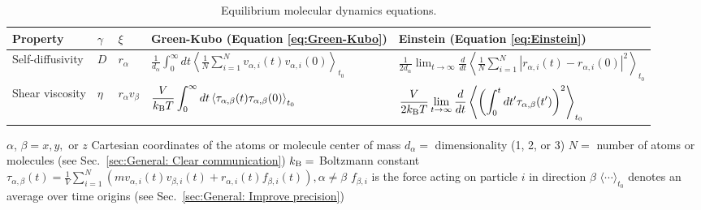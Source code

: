 \documentclass[9pt,bestpractices]{livecoms}
\begin{document}
\begin{table}[tb]
	\caption{\label{tab:EMD_equations}Equilibrium molecular dynamics equations.}

	\begin{tabular}{l l l l l}
		\toprule
		Property & $\gamma$          & $\xi$                        & Green-Kubo (Equation \ref{eq:Green-Kubo})    & Einstein (Equation \ref{eq:Einstein})     \\
		\midrule
		Self-diffusivity     & $D$ & $r_{\alpha}$          & $ \displaystyle \frac{1}{d_\alpha} \int_{0}^{\infty}dt\left\langle \frac{1}{N} \sum_{i=1}^{N} v_{\alpha,i}(t) v_{\alpha,i}(0)\right\rangle_{t_0}$    & $ \displaystyle \frac{1}{2d_\alpha} \lim_{t\to\infty} \frac{d}{dt} \left\langle \frac{1}{N} \sum_{i=1}^{N} |r_{\alpha,i}(t)-r_{\alpha,i}(0)|^2 \right\rangle_{t_0}$   \\
		Shear viscosity     & $\eta$       & $r_\alpha v_\beta$           & $ \displaystyle \frac{V}{k_{\rm B}T} \int_{0}^{\infty}dt\left\langle \tau_{\alpha,\beta}(t) \tau_{\alpha,\beta}(0)\right\rangle_{t_0}$    & $ \displaystyle \frac{V}{2k_{\rm B}T} \lim_{t\to\infty} \frac{d}{dt} \left\langle \left(\int_{0}^{t}dt' \tau_{\alpha,\beta}(t')\right)^2 \right\rangle_{t_0}$  \\
		\bottomrule
	\end{tabular}
	\newline
	$\alpha$, $\beta = x, y, $ or $z$ Cartesian coordinates of the atoms or molecule center of mass \newline
	$d_\alpha =$ dimensionality (1, 2, or 3) \newline
	$N=$ number of atoms or molecules (see Sec.\ \ref{sec:General: Clear communication}) \newline
	$k_{\rm B}=$ Boltzmann constant \newline
	$\tau_{\alpha,\beta}(t) = \frac{1}{V} \sum_{i=1}^{N} \left( m v_{\alpha,i}(t) v_{\beta,i}(t) + r_{\alpha,i}(t) f_{\beta,i}(t) \right) , \alpha \ne \beta$ \newline
	$f_{\beta,i}$ is the force acting on particle $i$ in direction $\beta$ \newline
	$\langle \cdots \rangle_{t_0}$ denotes an average over time origins (see Sec.\ \ref{sec:General: Improve precision})
\end{table}
\end{document}

